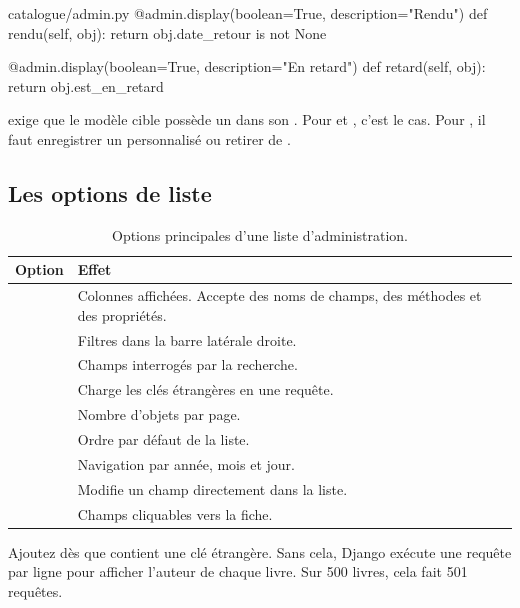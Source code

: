 \begin{codebox}[python]{catalogue/admin.py}
    @admin.display(boolean=True, description="Rendu")
    def rendu(self, obj):
        return obj.date_retour is not None

    @admin.display(boolean=True, description="En retard")
    def retard(self, obj):
        return obj.est_en_retard
\end{codebox}

\begin{attention}
 exige que le modèle cible possède un
 dans son . Pour  et
, c'est le cas. Pour , il faut enregistrer un
 personnalisé ou retirer  de
.
\end{attention}

\subsection{Les options de liste}

\begin{table}[htbp]
\centering
\small
\begin{tabularx}{\textwidth}{L{5.1cm} X}
\toprule
\textbf{Option} & \textbf{Effet} \\
\midrule
{} & Colonnes affichées. Accepte des noms de champs, des
méthodes et des propriétés. \\
 & Filtres dans la barre latérale droite. \\
 & Champs interrogés par la recherche. \\
 & Charge les clés étrangères en une requête. \\
 & Nombre d'objets par page. \\
 & Ordre par défaut de la liste. \\
 & Navigation par année, mois et jour. \\
 & Modifie un champ directement dans la liste. \\
 & Champs cliquables vers la fiche. \\
\bottomrule
\end{tabularx}
\caption{Options principales d'une liste d'administration.}
\end{table}

\begin{bonne}
Ajoutez  dès que  contient une clé
étrangère. Sans cela, Django exécute une requête par ligne pour afficher l'auteur
de chaque livre. Sur 500 livres, cela fait 501 requêtes.
\end{bonne}

